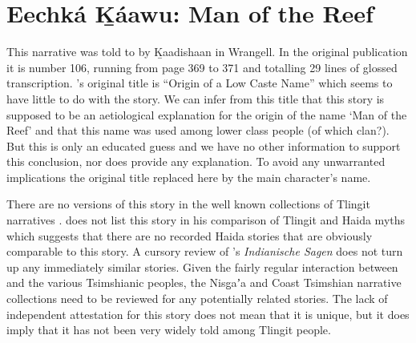 
\resetexcnt
\chapter{Eechká Ḵáawu: Man of the Reef}\label{ch:106-low-caste-name}

This narrative was told to \citeauthor{swanton:1909} by Ḵaadishaan in Wrangell.
In the original publication it is number 106, running from page 369 to 371 and totalling 29 lines of glossed transcription.
\citeauthor{swanton:1909}’s original title is “Origin of a Low Caste Name” which seems to have little to do with the story.
We can infer from this title that this story is supposed to be an aetiological explanation for the origin of the name  ‘Man of the Reef’ and that this name was used among lower class people (of which clan?).
But this is only an educated guess and we have no other information to support this conclusion, nor does \citeauthor{swanton:1909} provide any explanation.
To avoid any unwarranted implications the original title replaced here by the main character’s name.

There are no versions of this story in the well known collections of Tlingit narratives \parencites{de-laguna:1972}{dauenhauer:1987}{nyman:1993}{mcclellan-cruikshank:2007c}.
\citeauthor{swanton:1905} does not list this story in his comparison of Tlingit and Haida myths \parencite{swanton:1905} which suggests that there are no recorded Haida stories that are obviously comparable to this story.
A cursory review of \citeauthor{boas:1895}’s \textit{Indianische Sagen} \parencites{boas:1895}{boas:2002} does not turn up any immediately similar stories.
Given the fairly regular interaction between  and the various Tsimshianic peoples, the Nisg̱aʼa and Coast Tsimshian narrative collections \parencites{boas:1902}{boas-tate:1916} need to be reviewed for any potentially related stories.
The lack of independent attestation for this story does not mean that it is unique, but it does imply that it has not been very widely told among Tlingit people.

